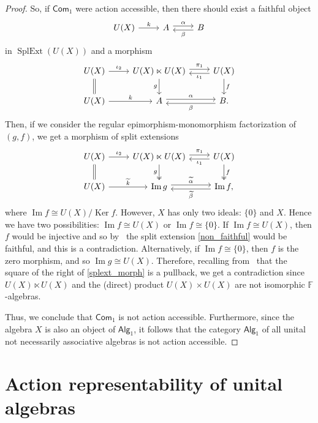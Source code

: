 \documentclass[reqno,a4paper]{amsart}
\theoremstyle{plain}
\theoremstyle{definition}
\theoremstyle{remark}
\numberwithin{equation}{section}
\newcommand{\F}{\mathbb{F}}
\DeclareMathOperator{\Ker}{Ker}
\DeclareMathOperator{\SplExt}{SplExt}
\DeclareMathOperator{\Imm}{Im}
\newcommand{\Com}{\ensuremath{\mathsf{Com}}}
\newcommand{\Alg}{\ensuremath{\mathsf{Alg}}}
\begin{document}
\begin{proof}
So, if $\Com_1$ were action
accessible, then there should exist a faithful object
\[
\begin{tikzcd}
U(X) \arrow [r, "k"]
& A \arrow[r, shift left, "\alpha"] &
B \ar[l, shift left, "\beta"]
\end{tikzcd}
\]
in $\SplExt(U(X))$ and a morphism
\[
\begin{tikzcd}
U(X) \arrow [r, "\iota_2"] \ar[d, equal]
&U(X) \ltimes U(X) \arrow[r, shift left, "\pi_1"] \ar[d, "g"']&
U(X) \ar[l, shift left, "\iota_1"]\ar[d, "f"] \\
U(X) \arrow [r, "k"]
& A \arrow[r, shift left, "\alpha"] &
B \ar[l, shift left, "\beta"] .
\end{tikzcd}
\]
Then, if we consider the regular epimorphism-monomorphism factorization of $(g,f)$, we get a morphism of split extensions
\begin{equation}\label{splext_morph}
\begin{tikzcd}
U(X) \arrow [r, "\iota_2"] \ar[d, equal]
&U(X) \ltimes U(X) \arrow[r, shift left, "\pi_1"] \ar[d, twoheadrightarrow, "g"']&
U(X) \ar[l, shift left, "\iota_1"]\ar[d, twoheadrightarrow, "f"]\\
U(X) \arrow [r, "\widetilde k"]
& \Imm g \arrow[r, shift left, "\widetilde \alpha"] &
\Imm f \ar[l, shift left, "\widetilde \beta"],
\end{tikzcd}
\end{equation}
where $\Imm f \cong U(X)/\Ker f$. However, $X$ has only two ideals: $\{ 0 \}$ and $X$. Hence we have two possibilities: $\Imm f \cong U(X)$ or $\Imm f \cong \{ 0 \}$. If $\Imm f \cong U(X)$, then $f$ would be injective and so by~\cite[Proposition 1.4]{act_accessible} the split extension \eqref{non_faithful} would be faithful, and this is a contradiction. Alternatively, if $\Imm f \cong \{ 0 \}$, then $f$ is the zero morphism, and so $\Imm g \cong U(X)$. Therefore, recalling from~\cite{malcev} that the square of the right of \eqref{splext_morph} is a pullback, we get a contradiction since $U(X) \ltimes U(X)$ and the (direct) product $U(X) \times U(X)$ are not isomorphic $\F$-algebras. 

Thus, we conclude that $\Com_1$ is not action accessible. Furthermore, since the algebra $X$ is also an object of $\Alg_1$, it follows that the category $\Alg_1$ of all unital not necessarily associative algebras is not action accessible.
\end{proof}

\section{Action representability of unital algebras}\label{SecMain}
\end{document}
